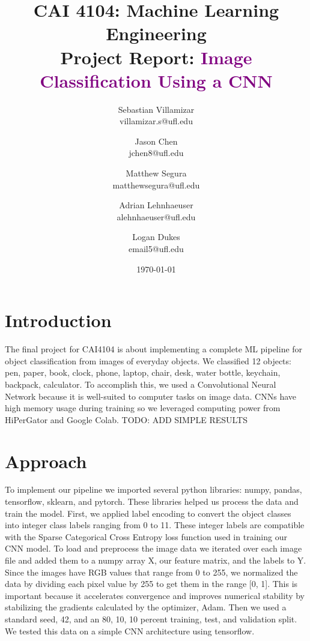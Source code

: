\documentclass[10pt]{article}
\title{CAI 4104: Machine Learning Engineering\\
	\large Project Report:  {\textcolor{purple}{Image Classification Using a CNN}}} %
\author{
        Sebastian Villamizar \\
        villamizar.s@ufl.edu\\
        \and
        Jason Chen \\
        jchen8@ufl.edu\\
        \and
        Matthew Segura \\
        matthewsegura@ufl.edu\\
        \and
        Adrian Lehnhaeuser \\
        alehnhaeuser@ufl.edu\\
        \and
        Logan Dukes\\
        email5@ufl.edu\\
}
\date{\today}
\begin{document}

\maketitle






\section{Introduction}
The final project for CAI4104 is about implementing a complete ML pipeline for object classification from images of everyday objects. We classified 12 objects: pen, paper, book, clock, phone, laptop, chair, desk, water bottle, keychain, backpack, calculator. To accomplish this, we used a Convolutional Neural Network because it is well-suited to computer tasks on image data. CNNs have high memory usage during training so we leveraged computing power from HiPerGator and Google Colab. TODO: ADD SIMPLE RESULTS




\section{Approach}
To implement our pipeline we imported several python libraries: numpy, pandas, tensorflow, sklearn, and pytorch. These libraries helped us process the data and train the model. First, we applied label encoding to convert the object classes into integer class labels ranging from 0 to 11. These integer labels are compatible with the Sparse Categorical Cross Entropy loss function used in training our CNN model. To load and preprocess the image data we iterated over each image file and added them to a numpy array X, our feature matrix, and the labels to Y. Since the images have RGB values that range from 0 to 255, we normalized the data by dividing each pixel value by 255 to get them in the range [0, 1]. This is important because it accelerates convergence and improves numerical stability by stabilizing the gradients calculated by the optimizer, Adam. Then we used a standard seed, 42, and an 80, 10, 10 percent training, test, and validation split. We tested this data on a simple CNN architecture using tensorflow. 
\end{document}
